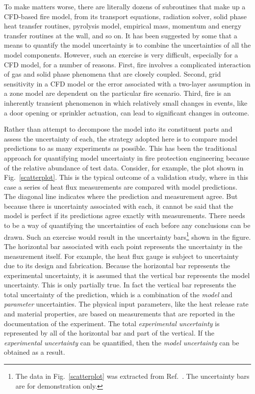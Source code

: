 To make matters worse, there are literally dozens of subroutines that make up a CFD-based fire model,
from its transport equations, radiation solver, solid phase heat transfer routines, pyrolysis model,
empirical mass, momentum and energy transfer routines at the wall, and so on.
It has been suggested by some that
a means to quantify the model uncertainty is to combine the uncertainties of all the model
components.
However, such an exercise is very difficult, especially for a CFD model,
for a number of reasons. First, fire involves
a complicated interaction of gas and solid phase phenomena that are closely coupled.
Second, grid sensitivity in a CFD model or the error associated with
a two-layer assumption in a zone model are dependent on the particular fire scenario.
Third, fire is an inherently transient phenomenon in which relatively small
changes in events, like a door opening or sprinkler actuation, can lead to significant changes in outcome.

Rather than attempt to decompose the model into its constituent parts and assess the uncertainty of
each, the strategy adopted here is to compare model predictions to as many
experiments as possible. This has been the traditional approach for quantifying model uncertainty in fire
protection engineering because of the relative abundance of test data. Consider, for example, the
plot shown in Fig.~\ref{scatterplot}. This is the typical outcome of a validation study, where in this case a series of
heat flux measurements are compared with model predictions.
The diagonal line indicates where the prediction and measurement agree.
But because there is uncertainty associated with each, it cannot be said that the model is perfect if its predictions
agree exactly with measurements.
There needs to be a way of quantifying the uncertainties of each before any conclusions can be drawn.
Such an exercise would result in the uncertainty
bars\footnote{The data in Fig.~\ref{scatterplot} was extracted from Ref.~\cite{NUREG_1824_Sup_1}.
The uncertainty bars are for demonstration only.}
shown in the figure. The
horizontal bar associated with each point represents the uncertainty in the measurement itself.
For example, the heat flux gauge is subject to uncertainty due to its design and fabrication.
Because the horizontal bar represents the experimental uncertainty, it is assumed that the vertical
bar represents the model uncertainty. This is only partially true. In fact the vertical bar represents the total
uncertainty of the prediction, which is a combination of the {\em model} and {\em parameter} uncertainties. The physical
input parameters, like the heat release rate and material properties, are based on measurements that are reported
in the documentation of the experiment.
The total {\em experimental uncertainty} is represented by all of the horizontal bar and part of the vertical.
If the {\em experimental uncertainty} can be quantified, then the {\em model uncertainty} can be obtained as a result.


